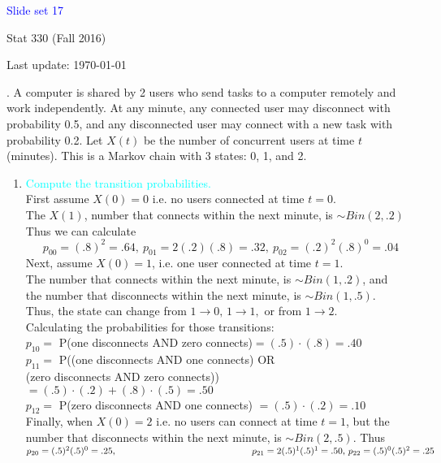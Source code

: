 \documentclass[20pt,landscape]{foils}
\newcommand{\no}{\noindent}
\newcommand{\bul}{\hspace*{.3in}{\textcolor{red}{$\bullet$ \ }}}
\begin{document}
\LogoOff

\foilhead[1.3in]{}
\centerline{\LARGE \textcolor{blue}{Slide set 17}}
\vspace{0.3in}
\centerline{\large Stat 330 (Fall 2016)}
\vspace{0.2in}
\centerline{\tiny Last update: \today}
\setcounter{page}{0}


\foilhead[-.8in]{\textcolor{blue}{Example 6.9 (Baron)}}
\no {\textcolor{magenta}{Shared Device}}. A computer is shared by 2 users who send
tasks to a computer remotely and work independently. At any minute,
any connected user may disconnect with probability 0.5, and any disconnected
user may connect with a new task with probability 0.2. Let $X(t)$
be the number of concurrent users at time $t$ (minutes). This is
a Markov chain with 3 states: 0, 1, and 2. 
\begin{enumerate}
\item {\textcolor{cyan}{Compute the transition probabilities.}}\\[.1in]
First assume $X(0)=0$ i.e. no users connected at time $t=0$.\\[.1in]
The $X(1)$, number that connects within the next minute, is $\sim Bin(2,.2)$\\[.1in]
Thus we can calculate 
$$p_{00}= (.8)^2=.64,\ p_{01}= 2(.2)(.8)=.32,\  p_{02}= (.2)^2(.8)^0=.04$$
Next, assume $X(0)=1$, i.e. one user connected at time $t=1$.\\[.1in]
The number that connects within the next minute, is $\sim Bin(1,.2)$, and\\
 the number that disconnects within the next minute, is $\sim Bin(1,.5)$.\\[.1in]
Thus, the state can change from $1 \rightarrow 0,\,1 \rightarrow 1,$ or from $1 \rightarrow 2$.\\
Calculating the probabilities for those transitions:\\[.1in]
\bul $p_{10}= $ P(one disconnects AND zero connects)$=(.5) \cdot (.8)=.40$\\[.1in]
\bul $p_{11}= $ P((one disconnects AND one connects) OR \\
\hspace*{3in}(zero disconnects AND zero connects))\\
\hspace*{3in} $=(.5)\cdot (.2) + (.8)\cdot (.5)=.50 $\\[.1in]
\bul $p_{12}= $ P(zero disconnects AND one connects) $=(.5)\cdot (.2) =.10 $\\[.1in]
Finally, when $X(0)=2$ i.e. no users can  connect at time $t=1$, but the number that disconnects within the next minute, is $\sim Bin(2,.5)$.
Thus \\[.1in]
\bul $p_{20}= (.5)^2(.5)^0=.25,\\
\hspace*{2in} \,p_{21}= 2(.5)^1(.5)^1=.50,\,p_{22}= (.5)^0(.5)^2=.25$ 


\end{enumerate}
\end{document}
